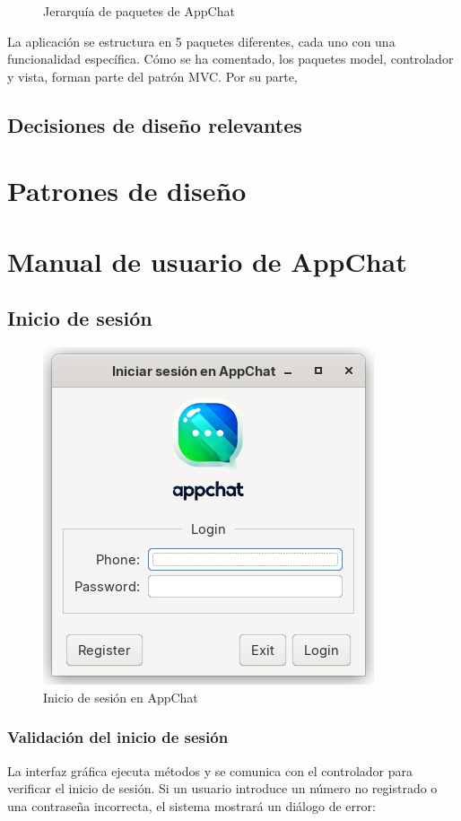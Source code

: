 \documentclass[11pt]{article}
\begin{document}
\begin{figure}[H]
	\centering
	\caption{Jerarquía de paquetes de AppChat}
	\label{fig:paquetes}
\end{figure}

La aplicación se estructura en 5 paquetes diferentes, cada uno con una funcionalidad específica. Cómo se ha comentado, los paquetes model, controlador y vista, forman parte del patrón MVC. Por su parte, 

\subsection{Decisiones de diseño relevantes}

\section{Patrones de diseño}

\clearpage

\section{Manual de usuario de AppChat}

\subsection{Inicio de sesión}

\begin{figure}[H]
	\centering
	\includegraphics[width=0.4\linewidth]{login}
	\caption{Inicio de sesión en AppChat}
	\label{fig:login}
\end{figure}

\subsubsection{Validación del inicio de sesión}

La interfaz gráfica ejecuta métodos y se comunica con el controlador para verificar el inicio de sesión. Si un usuario introduce un número no registrado o una contraseña incorrecta, el sistema mostrará un diálogo de error:
\end{document}
